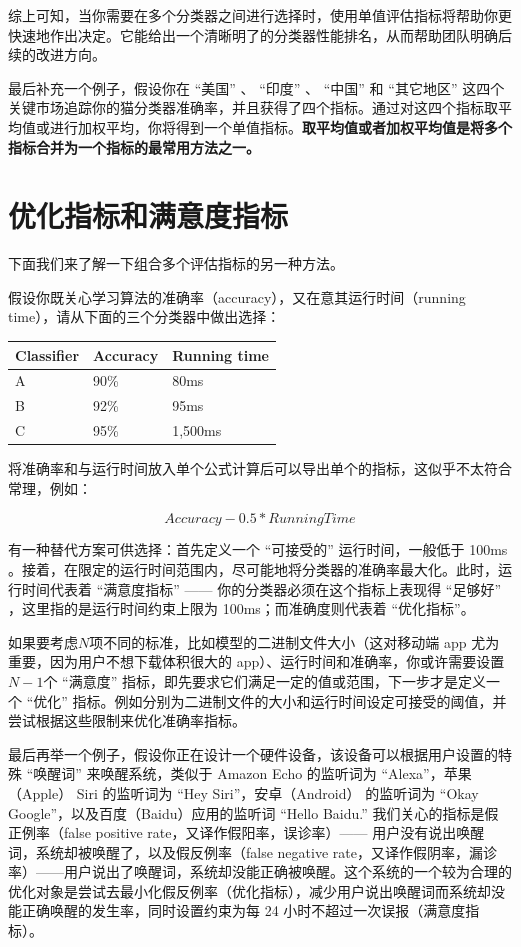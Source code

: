 综上可知，当你需要在多个分类器之间进行选择时，使用单值评估指标将帮助你更快速地作出决定。它能给出一个清晰明了的分类器性能排名，从而帮助团队明确后续的改进方向。

最后补充一个例子，假设你在 ``美国'' 、 ``印度'' 、 ``中国'' 和
``其它地区''
这四个关键市场追踪你的猫分类器准确率，并且获得了四个指标。通过对这四个指标取平均值或进行加权平均，你将得到一个单值指标。\textbf{取平均值或者加权平均值是将多个指标合并为一个指标的最常用方法之一。}

\hypertarget{ux4f18ux5316ux6307ux6807ux548cux6ee1ux610fux5ea6ux6307ux6807}{%
\chapter{优化指标和满意度指标}\label{ux4f18ux5316ux6307ux6807ux548cux6ee1ux610fux5ea6ux6307ux6807}}

下面我们来了解一下组合多个评估指标的另一种方法。

假设你既关心学习算法的准确率（accuracy），又在意其运行时间（running
time），请从下面的三个分类器中做出选择：

\begin{longtable}[]{@{}lll@{}}
\toprule
Classifier & Accuracy & Running time \\
\midrule
\endhead
A & 90\% & 80ms \\
B & 92\% & 95ms \\
C & 95\% & 1,500ms \\
\bottomrule
\end{longtable}

将准确率和与运行时间放入单个公式计算后可以导出单个的指标，这似乎不太符合常理，例如：

\[
Accuracy - 0.5 * RunningTime
\]

有一种替代方案可供选择：首先定义一个 ``可接受的'' 运行时间，一般低于
100ms
。接着，在限定的运行时间范围内，尽可能地将分类器的准确率最大化。此时，运行时间代表着
``满意度指标'' ------ 你的分类器必须在这个指标上表现得 ``足够好''
，这里指的是运行时间约束上限为 100ms；而准确度则代表着 ``优化指标''。

如果要考虑\(N\)项不同的标准，比如模型的二进制文件大小（这对移动端 app
尤为重要，因为用户不想下载体积很大的
app）、运行时间和准确率，你或许需要设置\(N-1\)个 ``满意度''
指标，即先要求它们满足一定的值或范围，下一步才是定义一个 ``优化''
指标。例如分别为二进制文件的大小和运行时间设定可接受的阈值，并尝试根据这些限制来优化准确率指标。

最后再举一个例子，假设你正在设计一个硬件设备，该设备可以根据用户设置的特殊
``唤醒词'' 来唤醒系统，类似于 Amazon Echo 的监听词为
``Alexa''，苹果（Apple） Siri 的监听词为 ``Hey Siri''，安卓（Android）
的监听词为 ``Okay Google''，以及百度（Baidu）应用的监听词 ``Hello
Baidu.'' 我们关心的指标是假正例率（false positive
rate，又译作假阳率，误诊率）------
用户没有说出唤醒词，系统却被唤醒了，以及假反例率（false negative
rate，又译作假阴率，漏诊率）------用户说出了唤醒词，系统却没能正确被唤醒。这个系统的一个较为合理的优化对象是尝试去最小化假反例率（优化指标），减少用户说出唤醒词而系统却没能正确唤醒的发生率，同时设置约束为每
24 小时不超过一次误报（满意度指标）。

